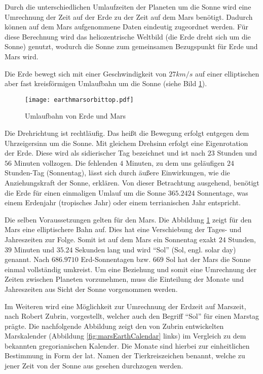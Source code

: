 Durch die unterschiedlichen Umlaufzeiten der Planeten um die Sonne wird eine
Umrechnung der Zeit auf der Erde zu der Zeit auf dem Mars ben{\"o}tigt.
Dadurch k{\"o}nnen auf dem Mars aufgenommene Daten eindeutig zugeordnet
werden.
F{\"u}r diese Berechnung wird das heliozentrische Weltbild (die Erde dreht sich
um die Sonne) genutzt, wodurch die Sonne zum gemeinsamen Bezugspunkt f{\"u}r
Erde und Mars wird.

Die Erde bewegt sich mit einer Geschwindigkeit von $27 km/s$ auf einer
elliptischen aber fast kreisf{\"o}rmigen Umlaufbahn um die Sonne (siehe Bild
\ref{fig:marsEarthOrbit}).

\begin{figure}[H]
	\centering
	\texttt{[image: earthmarsorbittop.pdf]}
	\label{fig:marsEarthOrbit}
	\caption{Umlaufbahn von Erde und Mars}
\end{figure}

Die Drehrichtung ist rechtl{\"a}ufig. Das hei{\ss}t die Bewegung erfolgt
entgegen dem Uhrzeigersinn um die Sonne. Mit gleichem Drehsinn erfolgt eine Eigenrotation
der Erde. Diese wird als sidierischer Tag bezeichnet und ist nach $23$ Stunden
und $56$ Minuten vollzogen. Die fehlenden $4$ Minuten, zu dem uns gel{\"a}ufigen
$24$ Stunden-Tag (Sonnentag), l{\"a}sst sich durch {\"a}u{\ss}ere Einwirkungen,
wie die Anziehungskraft der Sonne, erkl{\"a}ren. Von dieser Betrachtung
ausgehend, ben{\"o}tigt die Erde f{\"u}r einen einmaligen Umlauf um die Sonne
$365.2424$ Sonnentage, was einem Erdenjahr (tropisches Jahr) oder einem
terrianischen Jahr entspricht.

Die selben Voraussetzungen gelten f{\"u}r den Mars. Die Abbildung
\ref{fig:marsEarthOrbit} zeigt f{\"u}r den Mars eine elliptischere Bahn
auf. Dies hat eine Verschiebung der Tages- und Jahreszeiten zur Folge. Somit ist
auf dem Mars ein Sonnentag exakt $24$ Stunden, $39$ Minuten und $35.24$ Sekunden lang und
wird "`Sol"' (Sol, engl. solar day) genannt. Nach $686.9710$ Erd-Sonnentagen
bzw. $669$ Sol hat der Mars die Sonne einmal vollst{\"a}ndig umkreist. Um eine Beziehung
und somit eine Umrechnung der Zeiten zwischen Planeten vorzunehmen, muss die
Einteilung der Monate und Jahreszeiten aus Sicht der Sonne vorgenommen werden.

Im Weiteren wird eine M{\"o}glichkeit zur Umrechnung der Erdzeit auf Marszeit,
nach Robert Zubrin, vorgestellt, welcher auch den Begriff "`Sol"'
f{\"u}r einen Marstag pr{\"a}gte. Die nachfolgende Abbildung zeigt den von Zubrin entwickelten
Marskalender (Abbildung \ref{fig:marsEarthCalendar} links) im Vergleich zu dem
bekannten gregorianischen Kalender. Die Monate sind hierbei zur einheitlichen
Bestimmung in Form der lat. Namen der Tierkreiszeichen benannt, welche zu jener
Zeit von der Sonne aus gesehen durchzogen werden.

